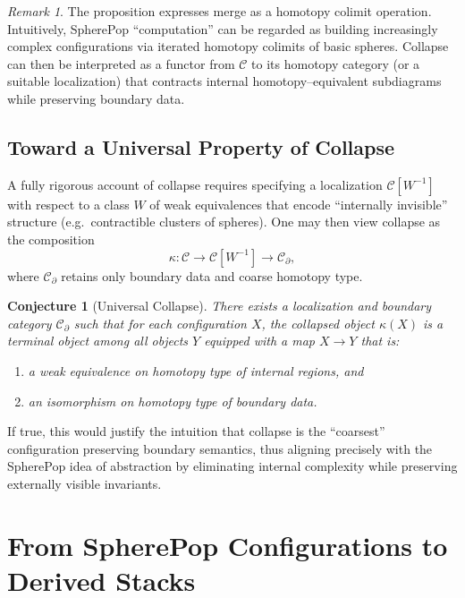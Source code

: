 \documentclass[12pt]{article}
\theoremstyle{plain}
\newtheorem{conjecture_env}[theorem]{Conjecture}
\theoremstyle{definition}
\theoremstyle{remark}
\newtheorem{remark}[theorem]{Remark}
\begin{document}
\begin{remark}
The proposition expresses merge as a homotopy colimit operation. Intuitively,
SpherePop ``computation'' can be regarded as building increasingly complex
configurations via iterated homotopy colimits of basic spheres. Collapse can
then be interpreted as a functor from $\mathcal{C}$ to its homotopy category
(or a suitable localization) that contracts internal homotopy--equivalent
subdiagrams while preserving boundary data.
\end{remark}

\subsection{Toward a Universal Property of Collapse}

A fully rigorous account of collapse requires specifying a localization
$\mathcal{C}[W^{-1}]$ with respect to a class $W$ of weak equivalences that
encode ``internally invisible'' structure (e.g.\ contractible clusters of
spheres). One may then view collapse as the composition
\[
    \kappa : \mathcal{C}
    \longrightarrow \mathcal{C}[W^{-1}]
    \longrightarrow \mathcal{C}_{\partial},
\]
where $\mathcal{C}_{\partial}$ retains only boundary data and coarse
homotopy type.

\begin{conjecture_env}[Universal Collapse]
There exists a localization and boundary category $\mathcal{C}_\partial$ such
that for each configuration $X$, the collapsed object $\kappa(X)$ is a terminal
object among all objects $Y$ equipped with a map $X\to Y$ that is:
\begin{enumerate}
    \item a weak equivalence on homotopy type of internal regions, and
    \item an isomorphism on homotopy type of boundary data.
\end{enumerate}
\end{conjecture_env}

If true, this would justify the intuition that collapse is the ``coarsest''
configuration preserving boundary semantics, thus aligning precisely with the
SpherePop idea of abstraction by eliminating internal complexity while preserving
externally visible invariants.

\newpage

\section{From SpherePop Configurations to Derived Stacks}
\end{document}
